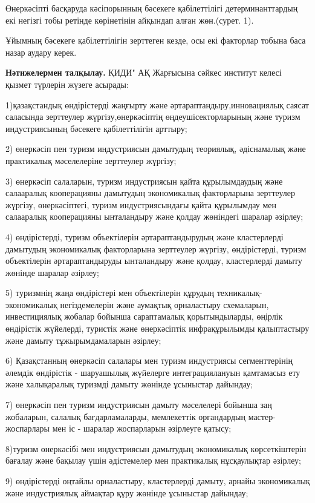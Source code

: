 \begin{multicols}{2}
Өнеркәсіпті басқаруда кәсіпорынның бәсекеге қабілеттілігі
детерминанттардың екі негізгі тобы ретінде көрінетінін айқындап алған
жөн.(сурет. 1).

Ұйымның бәсекеге қабілеттілігін зерттеген кезде, осы екі факторлар
тобына баса назар аудару керек.

{\bfseries Нәтижелермен талқылау.} ҚИДИ" АҚ Жарғысына сәйкес институт келесі
қызмет түрлерін жүзеге асырады:

1)қазақстандық өндірістерді жаңғырту және әртараптандыру,инновациялық
саясат саласында зерттеулер жүргізу,өнеркәсіптің өңдеушісекторларының
және туризм индустриясының бәсекеге қабілеттілігін арттыру;

2) өнеркәсіп пен туризм индустриясын дамытудың теориялық, әдіснамалық
және практикалық мәселелеріне зерттеулер жүргізу;

3) өнеркәсіп салаларын, туризм индустриясын қайта құрылымдаудың және
салааралық кооперацияны дамытудың экономикалық факторларына зерттеулер
жүргізу, өнеркәсіптегі, туризм индустриясындағы қайта құрылымдау мен
салааралық кооперацияны ынталандыру және қолдау жөніндегі шаралар
әзірлеу;

4) өндірістерді, туризм объектілерін әртараптандырудың және кластерлерді
дамытудың экономикалық факторларына зерттеулер жүргізу, өндірістерді,
туризм объектілерін әртараптандыруды ынталандыру және қолдау,
кластерлерді дамыту жөнінде шаралар әзірлеу;

5) туризмнің жаңа өндірістері мен объектілерін құрудың
техникалық-экономикалық негіздемелерін және аумақтық орналастыру
схемаларын, инвестициялық жобалар бойынша сараптамалық қорытындыларды,
өңірлік өндірістік жүйелерді, туристік және өнеркәсіптік инфрақұрылымды
қалыптастыру және дамыту тұжырымдамаларын әзірлеу;

6) Қазақстанның өнеркәсіп салалары мен туризм индустриясы сегменттерінің
әлемдік өндірістік - шаруашылық жүйелерге интеграциялануын қамтамасыз
ету және халықаралық туризмді дамыту жөнінде ұсыныстар дайындау;

7) өнеркәсіп пен туризм индустриясын дамыту мәселелері бойынша заң
жобаларын, салалық бағдарламаларды, мемлекеттік органдардың
мастер-жоспарлары мен іс - шаралар жоспарларын әзірлеуге қатысу;

8)туризм өнеркәсібі мен индустриясын дамытудың экономикалық
көрсеткіштерін бағалау және бақылау үшін әдістемелер мен практикалық
нұсқаулықтар әзірлеу;

9) өндірістерді оңтайлы орналастыру, кластерлерді дамыту, арнайы
экономикалық және индустриялық аймақтар құру жөнінде ұсыныстар дайындау;


\end{multicols}
